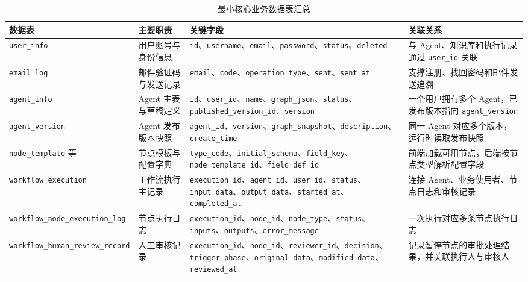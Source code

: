 \begin{table}[H]
  \centering
  \caption{最小核心业务数据表汇总}
  \label{tab:min_core_tables}
  \small
  \begin{tabularx}{\textwidth}{@{}p{3.1cm}p{2.7cm}X p{3.1cm}@{}}
    \toprule
    数据表 & 主要职责 & 关键字段 & 关联关系 \\
    \midrule
    \texttt{user\_info} & 用户账号与身份信息 & \texttt{id}、\texttt{username}、\texttt{email}、\texttt{password}、\texttt{status}、\texttt{deleted} & 与 Agent、知识库和执行记录通过 \texttt{user\_id} 关联 \\
    \texttt{email\_log} & 邮件验证码与发送记录 & \texttt{email}、\texttt{code}、\texttt{operation\_type}、\texttt{sent}、\texttt{sent\_at} & 支撑注册、找回密码和邮件发送追溯 \\
    \texttt{agent\_info} & Agent 主表与草稿定义 & \texttt{id}、\texttt{user\_id}、\texttt{name}、\texttt{graph\_json}、\texttt{status}、\texttt{published\_version\_id}、\texttt{version} & 一个用户拥有多个 Agent，已发布版本指向 \texttt{agent\_version} \\
    \texttt{agent\_version} & Agent 发布版本快照 & \texttt{agent\_id}、\texttt{version}、\texttt{graph\_snapshot}、\texttt{description}、\texttt{create\_time} & 同一 Agent 对应多个版本，运行时读取发布快照 \\
    \texttt{node\_template} 等 & 节点模板与配置字典 & \texttt{type\_code}、\texttt{initial\_schema}、\texttt{field\_key}、\texttt{node\_template\_id}、\texttt{field\_def\_id} & 前端加载可用节点，后端按节点类型解析配置字段 \\
    \texttt{workflow\_}\newline\texttt{execution} & 工作流执行主记录 & \texttt{execution\_id}、\texttt{agent\_id}、\texttt{user\_id}、\texttt{status}、\texttt{input\_data}、\texttt{output\_data}、\texttt{started\_at}、\texttt{completed\_at} & 连接 Agent、业务使用者、节点日志和审核记录 \\
    \texttt{workflow\_node\_}\newline\texttt{execution\_log} & 节点执行日志 & \texttt{execution\_id}、\texttt{node\_id}、\texttt{node\_type}、\texttt{status}、\texttt{inputs}、\texttt{outputs}、\texttt{error\_message} & 一次执行对应多条节点执行日志 \\
    \texttt{workflow\_human\_}\newline\texttt{review\_record} & 人工审核记录 & \texttt{execution\_id}、\texttt{node\_id}、\texttt{reviewer\_id}、\texttt{decision}、\texttt{trigger\_phase}、\texttt{original\_data}、\texttt{modified\_data}、\texttt{reviewed\_at} & 记录暂停节点的审批处理结果，并关联执行人与审核人 \\

\end{tabularx}
\end{table}
